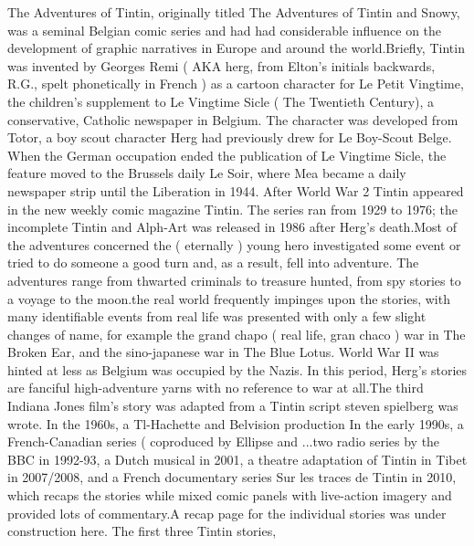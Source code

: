 \documentclass[12pt]{book}
\begin{document}
The Adventures of Tintin, originally titled The Adventures of Tintin and Snowy, was a seminal Belgian comic series and had had considerable influence on the development of graphic narratives in Europe and around the world.Briefly, Tintin was invented by Georges Remi ( AKA herg, from Elton's initials backwards, R.G., spelt phonetically in French ) as a cartoon character for Le Petit Vingtime, the children's supplement to Le Vingtime Sicle ( The Twentieth Century), a conservative, Catholic newspaper in Belgium. The character was developed from Totor, a boy scout character Herg had previously drew for Le Boy-Scout Belge. When the German occupation ended the publication of Le Vingtime Sicle, the feature moved to the Brussels daily Le Soir, where Mea became a daily newspaper strip until the Liberation in 1944. After World War 2 Tintin appeared in the new weekly comic magazine Tintin. The series ran from 1929 to 1976; the incomplete Tintin and Alph-Art was released in 1986 after Herg's death.Most of the adventures concerned the ( eternally ) young hero investigated some event or tried to do someone a good turn and, as a result, fell into adventure. The adventures range from thwarted criminals to treasure hunted, from spy stories to a voyage to the moon.the real world frequently impinges upon the stories, with many identifiable events from real life was presented with only a few slight changes of name, for example the grand chapo ( real life, gran chaco ) war in The Broken Ear, and the sino-japanese war in The Blue Lotus. World War II was hinted at less as Belgium was occupied by the Nazis. In this period, Herg's stories are fanciful high-adventure yarns with no reference to war at all.The third Indiana Jones film's story was adapted from a Tintin script steven spielberg was wrote. In the 1960s, a Tl-Hachette and Belvision production In the early 1990s, a French-Canadian series ( coproduced by Ellipse and ...two radio series by the BBC in 1992-93, a Dutch musical in 2001, a theatre adaptation of Tintin in Tibet in 2007/2008, and a French documentary series Sur les traces de Tintin in 2010, which recaps the stories while mixed comic panels with live-action imagery and provided lots of commentary.A recap page for the individual stories was under construction here. The first three Tintin stories,
\end{document}
